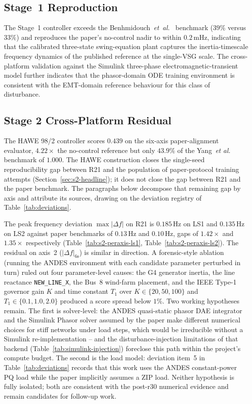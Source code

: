 \documentclass{unnc-fyp}
\begin{document}
\subsection{Stage~1 Reproduction}

The Stage~1 controller exceeds the
Benhmidouch~\emph{et~al.}~\cite{benhmidouch2024td3} benchmark
($39\%$ versus $33\%$) and reproduces the paper's no-control
nadir to within $0.2$\,mHz, indicating that the calibrated
three-state swing-equation plant captures the inertia-timescale
frequency dynamics of the published reference at the single-VSG
scale.
The cross-platform validation against the Simulink three-phase
electromagnetic-transient model further indicates that the
phasor-domain ODE training environment is consistent with the
EMT-domain reference behaviour for this class of disturbance.

\subsection{Stage 2 Cross-Platform Residual}
\label{sec:s2-residual}

The HAWE 98/2 controller scores $0.439$ on the six-axis
paper-alignment evaluator, $4.22\times$ the no-control reference
but only $43.9\%$ of the Yang~\emph{et al.}~\cite{yang2023ddic}
benchmark of $1.000$.
The HAWE construction closes the single-seed reproducibility gap
between R21 and the population of paper-protocol training
attempts (Section~\ref{sec:s2-headline}); it does not close the
gap between R21 and the paper benchmark.
The paragraphs below decompose that remaining gap by axis and
attribute its sources, drawing on the deviation registry of
Table~\ref{tab:deviations}.

The peak frequency deviation $\max|\Delta f|$ on R21 is $0.185$\,Hz
on LS1 and $0.135$\,Hz on LS2 against paper benchmarks of
$0.13$\,Hz and $0.10$\,Hz, gaps of $1.42\times$ and $1.35\times$
respectively (Table~\ref{tab:s2-peraxis-ls1},
Table~\ref{tab:s2-peraxis-ls2}).
The residual on axis~2 ($|\Delta f|_{6\mathrm{s}}$) is similar in
direction.
A forensic-style ablation (running the ANDES environment with
each candidate parameter perturbed in turn) ruled out four
parameter-level causes: the G4 generator inertia, the line
reactance \verb|NEW_LINE_X|, the Bus~8 wind-farm placement, and
the IEEE Type-1 governor gain $K$ and time constant $T_1$ over
$K \in \{20, 50, 100\}$ and $T_1 \in \{0.1, 1.0, 2.0\}$ produced
a score spread below $1\%$.
Two working hypotheses remain.
The first is solver-level: the ANDES quasi-static phasor DAE
integrator and the Simulink Phasor solver assumed by the paper
make different numerical choices for stiff networks under load
steps, which would be irreducible without a Simulink
re-implementation -- and the disturbance-injection limitations of
that backend (Table~\ref{tab:simulink-injection}) foreclose this
path within the project's compute budget.
The second is the load model: deviation item~5 in
Table~\ref{tab:deviations} records that this work uses the ANDES
constant-power PQ load while the paper implicitly assumes a ZIP
load.
Neither hypothesis is fully isolated; both are consistent with
the post-r30 numerical evidence and remain candidates for
follow-up work.
\end{document}
